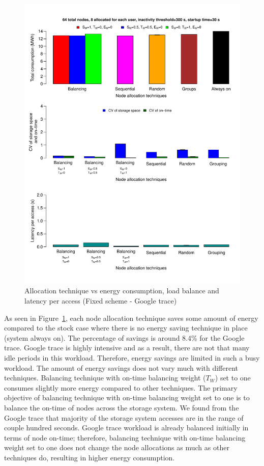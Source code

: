 \begin{figure}[!htbp]
\centering
\includegraphics[width=\columnwidth,keepaspectratio]{FIG6.pdf}
\caption{Allocation technique vs energy consumption, load balance and latency per access (Fixed scheme - Google trace)}
\label{firstresult}
\end{figure}

As seen in Figure~\ref{firstresult}, each node allocation technique saves some amount of energy
compared to the stock case where there is no energy saving technique in place (system always on).
The percentage of savings is around 8.4\% for the Google trace. Google trace is highly intensive and as a
result, there are not that many idle periods in this workload. Therefore, energy savings are limited in
such a busy workload.
The amount of energy savings does not
vary much with different techniques. Balancing technique with on-time balancing weight ($T_W$) set to
one consumes slightly more energy compared to other techniques. The primary objective of balancing technique
with on-time balancing weight set to one is to balance the on-time of nodes across the storage system. We found
from the Google trace that majority of the storage system accesses are in the range of couple hundred seconds.
Google trace workload is already balanced initially in terms of node on-time; therefore, balancing technique
with on-time balancing weight set to one does not change the node allocations as much as other techniques do,
resulting in higher energy consumption.

